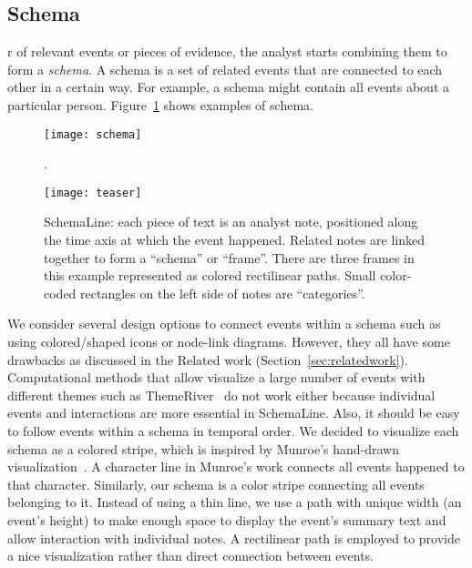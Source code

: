 \subsection{Schema}
r of relevant events or pieces of evidence, the analyst starts combining them to form a \textit{schema}. A schema is a set of related events that are connected to each other in a certain way. For example, a schema might contain all events about a particular person. Figure~\ref{fig:schema} shows examples of schema. 

\begin{figure}[ht]
	\centering
	\texttt{[image: schema]}
	\caption{.}
	\label{fig:schema}
\end{figure}

\begin{figure}[ht]
\centering
\texttt{[image: teaser]}
\caption{SchemaLine: each piece of text is an analyst note, positioned along the time axis at which the event happened. Related notes are linked together to form a ``schema'' or ``frame''. There are three frames in this example represented as colored rectilinear paths. Small color-coded rectangles on the left side of notes are ``categories''.}
\label{fig:teaser}
\end{figure}

We consider several design options to connect events within a schema such as using colored/shaped icons or node-link diagrams. However, they all have some drawbacks as discussed in the Related work (Section~\ref{sec:relatedwork}). Computational methods that allow visualize a large number of events with different themes such as ThemeRiver~\cite{Havre2002} do not work either because individual events and interactions are more essential in SchemaLine.  Also, it should be easy to follow events within a schema in temporal order. We decided to visualize each schema as a colored stripe, which is inspired by Munroe's hand-drawn visualization~\cite{Munroe2009}. A character line in Munroe's work connects all events happened to that character. Similarly, our schema is a color stripe connecting all events belonging to it. Instead of using a thin line, we use a path with unique width (an event's height) to make enough space to display the event's summary text and allow interaction with individual notes. A rectilinear path is employed to provide a nice visualization rather than direct connection between events. 